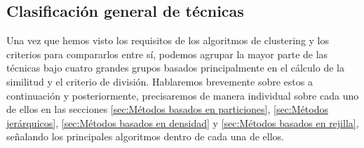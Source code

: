 \documentclass[10pt, a4paper]{article}
\begin{document}


\subsection{\textbf{Clasificación general de técnicas}} \label{subsec:Clasificación general de técnicas}

\cite{LIBRO} Una vez que hemos visto los requisitos de los algoritmos de clustering y los criterios para compararlos entre sí, podemos agrupar la mayor parte de las técnicas bajo cuatro grandes grupos basados principalmente en el cálculo de la similitud y el criterio de división. Hablaremos brevemente sobre estos a continuación y posteriormente, precisaremos de manera individual sobre cada uno de ellos en las secciones \ref{sec:Métodos basados en particiones}, \ref{sec:Métodos jerárquicos}, \ref{sec:Métodos basados en densidad} y \ref{sec:Métodos basados en rejilla}, señalando los principales algoritmos dentro de cada una de ellos.
\end{document}
